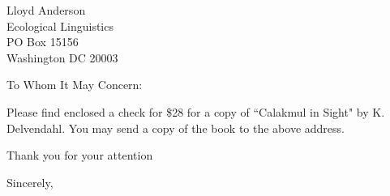 \documentclass[12pt]{letter}
\begin{document}
\begin{letter}{Lloyd Anderson \\
Ecological Linguistics \\
PO Box 15156 \\
Washington DC 20003}

\opening{To Whom It May Concern:} %

Please find enclosed a check for \$28 for a copy of ``Calakmul in Sight" by K. Delvendahl. You may send a copy of the book to the above address.

Thank you for your attention

\closing{Sincerely,} %

\end{letter}
\end{document}
